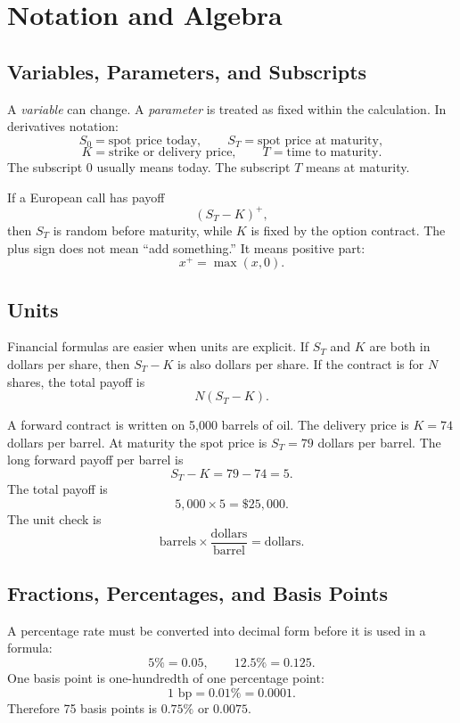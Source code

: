 \section{Notation and Algebra}

\subsection{Variables, Parameters, and Subscripts}

A \emph{variable} can change. A \emph{parameter} is treated as fixed within the
calculation. In derivatives notation:
\[
    S_0 = \text{spot price today}, \qquad S_T = \text{spot price at maturity},
\]
\[
    K = \text{strike or delivery price}, \qquad T = \text{time to maturity}.
\]
The subscript $0$ usually means today. The subscript $T$ means at maturity.

\begin{exmp}
If a European call has payoff
\[
    (S_T-K)^+,
\]
then $S_T$ is random before maturity, while $K$ is fixed by the option contract.
The plus sign does not mean ``add something.'' It means positive part:
\[
    x^+ = \max(x,0).
\]
\end{exmp}

\subsection{Units}

Financial formulas are easier when units are explicit. If $S_T$ and $K$ are both
in dollars per share, then $S_T-K$ is also dollars per share. If the contract is
for $N$ shares, the total payoff is
\[
    N(S_T-K).
\]

\begin{exmp}
A forward contract is written on 5,000 barrels of oil. The delivery price is
$K=74$ dollars per barrel. At maturity the spot price is $S_T=79$ dollars per
barrel. The long forward payoff per barrel is
\[
    S_T-K = 79-74 = 5.
\]
The total payoff is
\[
    5{,}000 \times 5 = \$25{,}000.
\]
The unit check is
\[
    \text{barrels} \times \frac{\text{dollars}}{\text{barrel}}
    =
    \text{dollars}.
\]
\end{exmp}

\subsection{Fractions, Percentages, and Basis Points}

A percentage rate must be converted into decimal form before it is used in a
formula:
\[
    5\% = 0.05, \qquad 12.5\% = 0.125.
\]
One basis point is one-hundredth of one percentage point:
\[
    1\text{ bp}=0.01\%=0.0001.
\]
Therefore 75 basis points is $0.75\%$ or $0.0075$.

